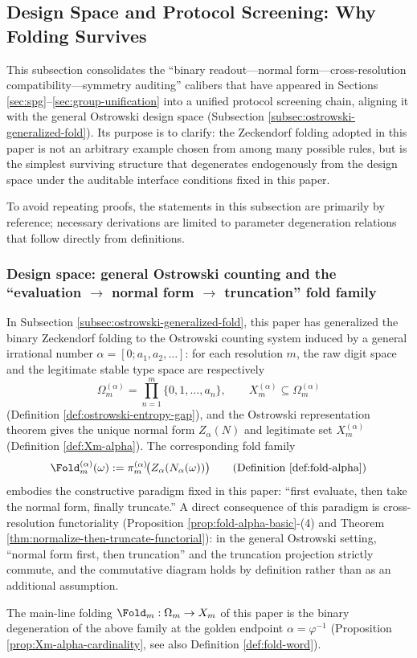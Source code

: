 \subsection{Design Space and Protocol Screening: Why Folding Survives}\label{subsec:protocol-screening-fold-survivor}

This subsection consolidates the ``binary readout---normal form---cross-resolution compatibility---symmetry auditing'' calibers that have appeared in Sections \ref{sec:spg}--\ref{sec:group-unification} into a unified protocol screening chain, aligning it with the general Ostrowski design space (Subsection \ref{subsec:ostrowski-generalized-fold}). Its purpose is to clarify: the Zeckendorf folding adopted in this paper is not an arbitrary example chosen from among many possible rules, but is the simplest surviving structure that degenerates endogenously from the design space under the auditable interface conditions fixed in this paper.\par
To avoid repeating proofs, the statements in this subsection are primarily by reference; necessary derivations are limited to parameter degeneration relations that follow directly from definitions.

\subsubsection{Design space: general Ostrowski counting and the ``evaluation \texorpdfstring{$\to$}{->} normal form \texorpdfstring{$\to$}{->} truncation'' fold family}
In Subsection \ref{subsec:ostrowski-generalized-fold}, this paper has generalized the binary Zeckendorf folding to the Ostrowski counting system induced by a general irrational number \(\alpha=[0;a_1,a_2,\dots]\): for each resolution \(m\), the raw digit space and the legitimate stable type space are respectively
\[
\Omega_m^{(\alpha)}=\prod_{n=1}^{m}\{0,1,\dots,a_n\},\qquad
X_m^{(\alpha)}\subseteq \Omega_m^{(\alpha)}
\]
(Definition \ref{def:ostrowski-entropy-gap}), and the Ostrowski representation theorem gives the unique normal form \(Z_\alpha(N)\) and legitimate set \(X_m^{(\alpha)}\) (Definition \ref{def:Xm-alpha}). The corresponding fold family
\[
\Fold_m^{(\alpha)}(\omega):=\pi_m^{(\alpha)}\!\bigl(Z_\alpha(N_\alpha(\omega))\bigr)
\qquad(\text{Definition \ref{def:fold-alpha}})
\]
embodies the constructive paradigm fixed in this paper: ``first evaluate, then take the normal form, finally truncate.'' A direct consequence of this paradigm is cross-resolution functoriality (Proposition \ref{prop:fold-alpha-basic}-(4) and Theorem \ref{thm:normalize-then-truncate-functorial}): in the general Ostrowski setting, ``normal form first, then truncation'' and the truncation projection strictly commute, and the commutative diagram holds by definition rather than as an additional assumption.\par
The main-line folding \(\Fold_m:\Omega_m\to X_m\) of this paper is the binary degeneration of the above family at the golden endpoint \(\alpha=\varphi^{-1}\) (Proposition \ref{prop:Xm-alpha-cardinality}, see also Definition \ref{def:fold-word}).

